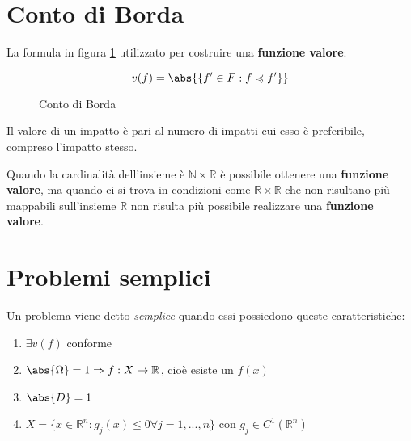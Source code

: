 \documentclass[\main/main.tex]{subfiles}
\begin{document}
\section{Conto di Borda}
La formula in figura \ref{borda} utilizzato per costruire una \textbf{funzione valore}:

\begin{figure}[H]
	\[
		v(f) = \abs{\{f' \in F: f \preccurlyeq f' \}}
	\]
	\caption{Conto di Borda}
	\label{borda}
\end{figure}

Il valore di un impatto è pari al numero di impatti cui esso è preferibile, compreso l'impatto stesso.

Quando la cardinalità dell'insieme è $\mathbb{N}\times\mathbb{R}$ è possibile ottenere una \textbf{funzione valore}, ma quando ci si trova in condizioni come $\mathbb{R}\times\mathbb{R}$ che non risultano più mappabili sull'insieme $\mathbb{R}$ non risulta più possibile realizzare una \textbf{funzione valore}.

\section{Problemi semplici}
Un problema viene detto \textit{semplice} quando essi possiedono queste caratteristiche:

\begin{enumerate}
	\item $\exists v(f) $ conforme
	\item $\abs{\Omega} = 1 \Rightarrow f: X \rightarrow \mathbb{R}$, cioè esiste un $f(x)$
	\item $\abs{D} = 1$
	\item $X = \{x \in \mathbb{R}^n: g_j (x) \leq 0 \forall j = 1,..., n \} \text{ con } g_j \in C^1(\mathbb{R}^n)$
\end{enumerate}
\end{document}
